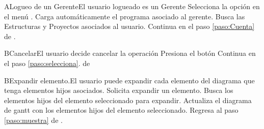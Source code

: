   \begin{UCtrayectoriaA}{A}{Logueo de un Gerente}{El usuario logueado es un Gerente}
    \UCpaso [\UCactor] Selecciona la opción  en el menú .
    \UCpaso Carga automáticamente el programa asociado al gerente.
    \UCpaso Busca las Estructuras y Proyectos asociados al usuario.
    \UCpaso Continua en el paso \ref{paso:Cuenta} de .
  \end{UCtrayectoriaA}

  \begin{UCtrayectoriaA}{B}{Cancelar}{El usuario decide cancelar la operación}
    \UCpaso[\UCactor] Presiona el botón 
    \UCpaso Continua en el paso \ref{paso:selecciona}. de 
  \end{UCtrayectoriaA}

  \begin{UCtrayectoriaA}{B}{Expandir elemento.}{El usuario puede expandir cada elemento del diagrama que tenga elementos hijos asociados.}
    \UCpaso[\UCactor] Solicita expandir un elemento.
    \UCpaso Busca los elementos hijos del elemento seleccionado para expandir.
    \UCpaso Actualiza el diagrama de gantt con los elementos hijos del elemento seleccionado.
    \UCpaso Regresa al paso \ref{paso:muestra} de .
  \end{UCtrayectoriaA}